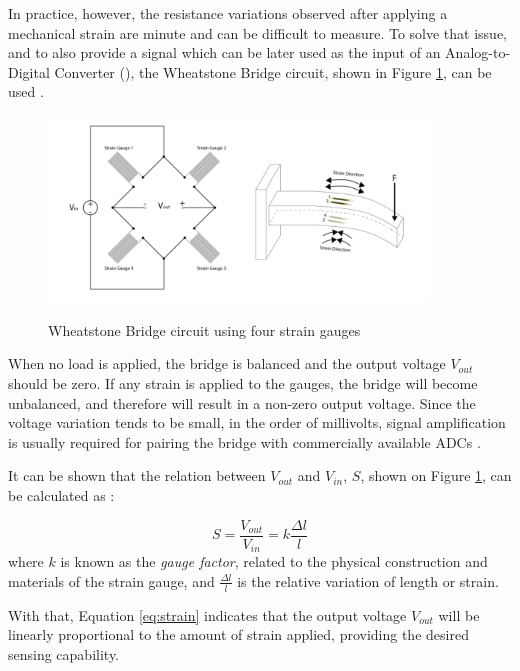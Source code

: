 In practice, however, the resistance variations observed after applying a
mechanical strain are minute and can be difficult to measure. To solve that issue,
and to also provide a signal which can be later used as the input of an
Analog-to-Digital Converter (), the Wheatstone
Bridge circuit, shown in Figure \ref{fig:gauge2}, can be used \cite{Michigan2020}.

\begin{figure}[H]
	\centering
	\caption[Wheatstone Bridge circuit using four strain gauges]{Wheatstone Bridge circuit using four strain gauges}
    \includegraphics[width=0.9\textwidth]{./images/straingauge2.png}
	\label{fig:gauge2}
\end{figure}

When no load is applied, the bridge is balanced and the output voltage
$V_{out}$ should be zero. If any strain is applied to the gauges, the bridge
will become unbalanced, and therefore will result in a non-zero output voltage.
Since the voltage variation tends to be small, in the order of millivolts, signal amplification is usually
required for pairing the bridge with commercially available ADCs \cite{HorowitzHill2015}.

It can be shown that the relation between $V_{out}$ and $V_{in}$, $S$, shown on Figure \ref{fig:gauge2}, can be
calculated as \cite{Stefanescu}:

\begin{equation}
    \label{eq:strain}
    S = \frac{V_{out}}{V_{in}} = k\frac{\Delta l}{l}
\end{equation}
where $k$ is known as the \textit{gauge factor}, related to the physical
construction and materials of the strain gauge, and $\frac{\Delta l}{l}$ is the
relative variation of length or strain.

With that, Equation \ref{eq:strain} indicates that the output voltage $V_{out}$
will be linearly proportional to the amount of strain applied, providing the
desired sensing capability.

